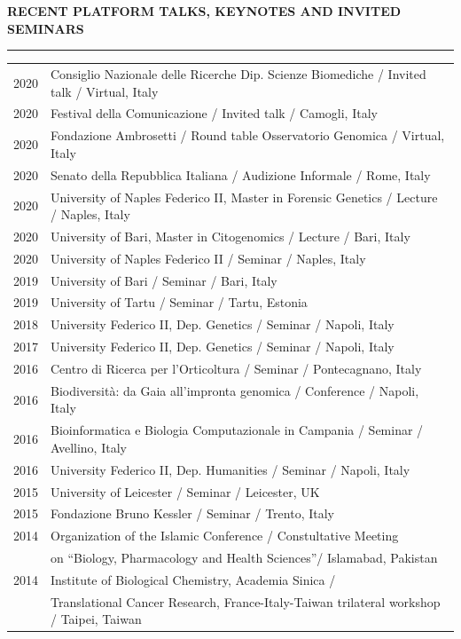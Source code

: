 \documentclass[openany]{book}
\begin{document}
\vspace{0.05cm}
\noindent
\MakeUppercase{\textbf{Recent Platform Talks, Keynotes and Invited Seminars}} \vspace{0.1cm}
\sectionlineskip
\hrule
\noindent
\begin{tabular}{ l l }
2020 & Consiglio Nazionale delle Ricerche Dip. Scienze Biomediche / Invited talk / Virtual, Italy \\
2020 & Festival della Comunicazione / Invited talk / Camogli, Italy \\
2020 & Fondazione Ambrosetti / Round table Osservatorio Genomica / Virtual, Italy \\
2020 & Senato della Repubblica Italiana / Audizione Informale / Rome, Italy \\
2020 & University of Naples Federico II, Master in Forensic Genetics / Lecture / Naples, Italy \\ 
2020 & University of Bari, Master in Citogenomics / Lecture / Bari, Italy \\
2020 & University of Naples Federico II / Seminar / Naples, Italy\\
2019 & University of Bari / Seminar / Bari, Italy \\
2019 & University of Tartu / Seminar / Tartu, Estonia\\
2018 &  University Federico II, Dep. Genetics / Seminar / Napoli, Italy\\
2017 &  University Federico II, Dep. Genetics / Seminar / Napoli, Italy\\
2016 & Centro di Ricerca per l’Orticoltura / Seminar / Pontecagnano, Italy\\
2016 & Biodiversità: da Gaia all’impronta genomica  / Conference / Napoli, Italy\\
2016 & Bioinformatica e Biologia Computazionale in Campania  / Seminar / Avellino, Italy\\
2016 &  University Federico II, Dep. Humanities / Seminar / Napoli, Italy\\
2015  & University of Leicester / Seminar / Leicester, UK\\
2015 & Fondazione Bruno Kessler / Seminar / Trento, Italy\\
{2014} & Organization of the Islamic Conference / Constultative Meeting\\ 
    & on “Biology, Pharmacology and Health Sciences”/ Islamabad, Pakistan\\
2014 & Institute of Biological Chemistry, Academia Sinica / \\                                       &Translational Cancer Research, France-Italy-Taiwan trilateral workshop / Taipei, Taiwan\\

\end{tabular}
\end{document}
